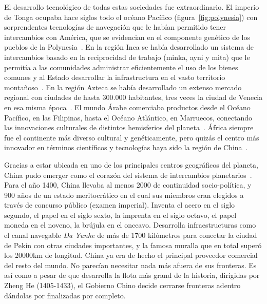 \documentclass[a4paper,10pt]{book}
\begin{document}
El desarrollo tecnológico de todas estas sociedades fue extraordinario. 
El imperio de Tonga ocupaba hace siglos todo el oc\'eano Pac\'ifico (figura~\ref{fig:polynesia}) con sorprendentes tecnologías de navegación que le habían permitido tener intercambios con América, que se evidencian en el componente genético de los pueblos de la Polynesia~\cite{thorsby2016-polynesiaAmerica, ioannidis2020-polynesiaAmerica}.
En la región Inca se había desarrollado un sistema de intercambios basado en la reciprocidad de trabajo (minka, ayni y mita) que le permitía a las comunidades administrar eficientemente el uso de los bienes comunes y al Estado desarrollar la infrastructura en el vasto territorio montañoso~\cite{murra}.
En la región Azteca se había desarrollado un extenso mercado regional con ciudades de hasta 300.000 habitantes, tres veces la ciudad de Venecia en esa misma época~\cite{www7.uc.cl}. %
El mundo \'Arabe comerciaba productos desde el Océano Pacífico, en las Filipinas, hasta el Oc\'eano Atl\'antico, en Marruecos, conectando las innovaciones culturales de distintos hemisferios del planeta~\cite{dussel}.
África siempre fue el continente más diverso cultural y genéticamente, pero quizás el centro más innovador en términos científicos y tecnologías haya sido la región de China~\cite{needham2004-generalConclusionsAndReflections}.


Gracias a estar ubicada en uno de los principales centros geográficos del planeta, China pudo emerger como el corazón del sistema de intercambios planetarios~\cite{pomeranz2000}.
Para el año 1400, China llevaba al menos 2000 de continuidad socio-pol\'itica, y 900 a\~nos de un estado meritocr\'atico en el cual sus miembros eran elegidos a trav\'es de concurso público (examen imperial).
Inventa el acero en el siglo segundo, el papel en el siglo sexto, la imprenta en el siglo octavo, el papel moneda en el noveno, la br\'ujula en el onceavo.
Desarrolla infraestructuras como el canal navegable \emph{Da Yunhe} de más de 1700 kilómetros para conectar la ciudad de Pekín con otras ciudades importantes, y la famosa muralla que en total superó los 20000km de longitud.
China ya era de hecho el principal proveedor comercial del resto del mundo.
No parecían necesitar nada más afuera de sus fronteras.
Es así como a pesar de que desarrolla la flota más grand de la historia, dirigidas por Zheng He (1405-1433), el Gobierno Chino decide cerrarse fronteras adentro dándolas por finalizadas por completo.
\end{document}

